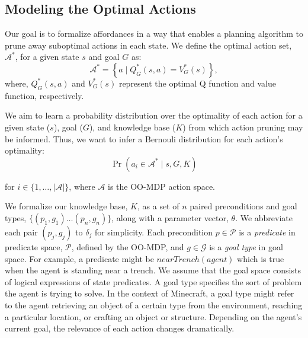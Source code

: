 \documentclass[letterpaper]{article}
\begin{document}
\subsection{Modeling the Optimal Actions}


Our goal is to formalize affordances in a way that enables a planning
algorithm to prune away suboptimal actions in each state. We define
the optimal action set, $\mathcal{A}^*$, for a given state $s$ and
goal $G$ as:
\begin{equation}
\mathcal{A}^* = \left\{ a \mid Q^*_G(s,a) = V^*_G(s) \right\}, 
\label{eq:opt_act_set}
\end{equation}
where, $Q^*_G(s,a)$ and $V^*_G(s)$ represent the optimal Q function and 
value function, respectively.

We aim to learn a probability distribution over the optimality of each action
for a given state ($s$), goal ($G$), and knowledge base ($K$) from
which action pruning may be informed. Thus, we want to infer a Bernouli
distribution for each action's optimality:
\begin{equation}
\Pr(a_i \in \mathcal{A}^* \mid s, G, K)
\label{eq:master}
\end{equation}

\noindent for $i \in \{1, \ldots, |\mathcal{A}|\}$, where $\mathcal{A}$ is the OO-MDP action space.

We formalize our knowledge base, $K$, as a set of $n$ paired
preconditions and goal types, $\{ (p_1, g_1) \ldots (p_{n}, g_{n})\}$,
along with a parameter vector, $\theta$. We abbreviate each pair
$(p_j, g_j)$ to $\delta_j$ for simplicity. Each precondition $p \in
\mathcal{P}$ is a {\it predicate} in predicate space, $\mathcal{P}$,
defined by the OO-MDP, and $g \in \mathcal{G}$ is a {\it goal type} in
goal space.  For example, a predicate might be $nearTrench(agent)$
which is true when the agent is standing near a trench. We assume
that the goal space consists of logical expressions of state
predicates. A goal type specifies the sort of problem the agent is
trying to solve. In the context of Minecraft, a goal type might
refer to the agent retrieving an object of a certain type from the
environment, reaching a particular location, or crafting an object or structure.
Depending on the agent's current goal, the relevance of each action changes
dramatically.
\end{document}
